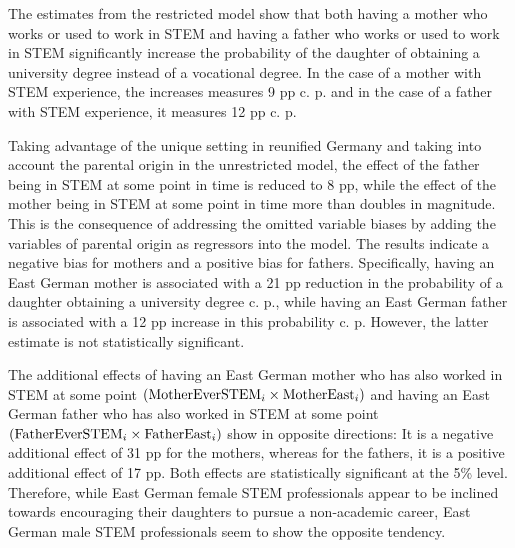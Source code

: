 \documentclass[a4paper, oneside, hyperfootnotes = false]{article}
\begin{document}
{The estimates from the restricted model show that both having a mother who works or used to work in STEM and having a father who works or used to work in STEM significantly increase the probability of the daughter of obtaining a university degree instead of a vocational degree.
In the case of a mother with STEM experience, the increases measures 9 pp c. p. and in the case of a father with STEM experience, it measures 12 pp c. p.

Taking advantage of the unique setting in reunified Germany and taking into account the parental origin in the unrestricted model, the effect of the father being in STEM at some point in time is reduced to 8 pp, while the effect of the mother being in STEM at some point in time more than doubles in magnitude.
This is the consequence of addressing the omitted variable biases by adding the variables of parental origin as regressors into the model.
The results indicate a negative bias for mothers and a positive bias for fathers.
Specifically, having an East German mother is associated with a 21 pp reduction in the probability of a daughter obtaining a university degree c. p., while having an East German father is associated with a 12 pp increase in this probability c. p.
However, the latter estimate is not statistically significant.

The additional effects of having an East German mother who has also worked in STEM at some point $(\textnormal{MotherEverSTEM}_{i} \times \textnormal{MotherEast}_{i})$  and having an East German father who has also worked in STEM at some point $(\textnormal{FatherEverSTEM}_{i} \times \textnormal{FatherEast}_{i})$ show in opposite directions:
It is a negative additional effect of 31 pp for the mothers, whereas for the fathers, it is a positive additional effect of 17 pp.
Both effects are statistically significant at the 5\% level.
Therefore, while East German female STEM professionals appear to be inclined towards encouraging their daughters to pursue a non-academic career, East German male STEM professionals seem to show the opposite tendency.

}
\end{document}
